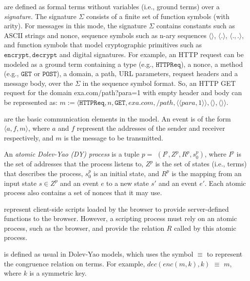  are defined as formal terms without variables (i.e., ground terms) over a {\em signature}. %
The signature $\Sigma$ consists of a finite set of function symbols (with arity). For messages in this mode, the signature $\Sigma$ contains constants such as ASCII strings and nonce, sequence symbols such as n-ary sequences $\langle \rangle$, $\langle . \rangle$, $\langle . ,. \rangle$, and function symbols that model cryptographic primitives such as $\mathtt{encrypt}, \mathtt{decrypt}$ and digital signatures. For example, an HTTP request can be modeled as a ground term containing a type (e.g., $\mathtt{HTTPReq}$), a nonce, a method (e.g., $\mathtt{GET}$ or $\mathtt{POST}$), a domain, a path, URL parameters, request headers and a message body, over the $\Sigma$ in the sequence symbol format. So,
an HTTP GET request for the domain {\sf exa.com/path?para=1} with empty header and body can be represented as: $m:=\langle\mathtt{HTTPReq},n,\mathtt{GET},exa.com,/path,\langle \langle para, 1\rangle \rangle ,\langle \rangle,\langle \rangle \rangle$.

 are the basic communication elements in the model. An event is of the form $\langle a, f, m \rangle$, where $a$ and $f$ represent the addresses of the sender and receiver respectively, and $m$ is the message to be transmitted.

 An {\em atomic Dolev-Yao (DY) process} is a tuple $p=$ $(I^p, Z^p, R^p,s_0^p )$, where $I^p$ is the set of addresses that the process listens to, $Z^p$ is the set of states (i.e., terms) that describes the process, $s_0^p$ is an initial state, and $R^p$ is the mapping from an input state $s \in Z^p$ and an event $e$ to a new state $s'$ and an event $e'$. %
Each atomic process also contains a set of nonces that it may use.

 represent client-side scripts loaded by the browser to provide server-defined functions to the browser. However, a scripting process must rely on an atomic process, such as the browser, and provide the relation $R$ called by this atomic process.

 is defined as usual in Dolev-Yao models, which uses the symbol $\equiv$ to represent the congruence relation on terms. For example, $dec(enc(m, k), k)$ $\equiv$ $m$, where $k$ is a symmetric key.

